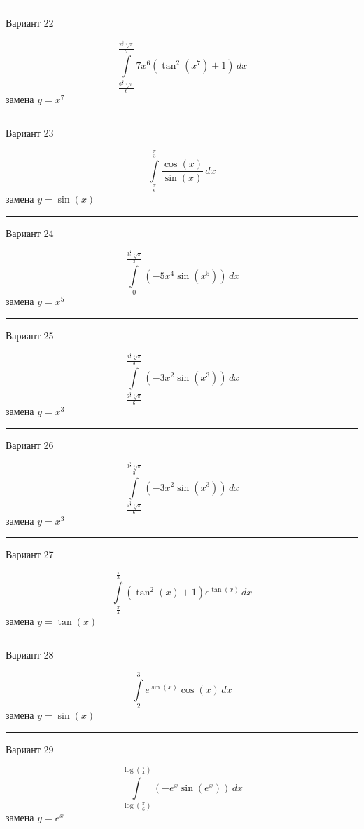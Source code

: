 \documentclass[11pt]{report}
\begin{document}
\rule{\textwidth}{.2mm}

Вариант 22

$$\int\limits_{\frac{6^{\frac{6}{7}} \sqrt[7]{\pi}}{6}}^{\frac{2^{\frac{5}{7}} \sqrt[7]{\pi}}{2}} 7 x^{6} \left(\tan^{2}{\left(x^{7} \right)} + 1\right)\, dx$$
замена $y = x^{7}$



\rule{\textwidth}{.2mm}

Вариант 23

$$\int\limits_{\frac{\pi}{6}}^{\frac{\pi}{3}} \frac{\cos{\left(x \right)}}{\sin{\left(x \right)}}\, dx$$
замена $y = \sin{\left(x \right)}$



\rule{\textwidth}{.2mm}

Вариант 24

$$\int\limits_{0}^{\frac{3^{\frac{4}{5}} \sqrt[5]{\pi}}{3}} \left(- 5 x^{4} \sin{\left(x^{5} \right)}\right)\, dx$$
замена $y = x^{5}$



\rule{\textwidth}{.2mm}

Вариант 25

$$\int\limits_{\frac{6^{\frac{2}{3}} \sqrt[3]{\pi}}{6}}^{\frac{3^{\frac{2}{3}} \sqrt[3]{\pi}}{3}} \left(- 3 x^{2} \sin{\left(x^{3} \right)}\right)\, dx$$
замена $y = x^{3}$



\rule{\textwidth}{.2mm}

Вариант 26

$$\int\limits_{\frac{6^{\frac{2}{3}} \sqrt[3]{\pi}}{6}}^{\frac{3^{\frac{2}{3}} \sqrt[3]{\pi}}{3}} \left(- 3 x^{2} \sin{\left(x^{3} \right)}\right)\, dx$$
замена $y = x^{3}$



\rule{\textwidth}{.2mm}

Вариант 27

$$\int\limits_{\frac{\pi}{4}}^{\frac{\pi}{3}} \left(\tan^{2}{\left(x \right)} + 1\right) e^{\tan{\left(x \right)}}\, dx$$
замена $y = \tan{\left(x \right)}$



\rule{\textwidth}{.2mm}

Вариант 28

$$\int\limits_{2}^{3} e^{\sin{\left(x \right)}} \cos{\left(x \right)}\, dx$$
замена $y = \sin{\left(x \right)}$



\rule{\textwidth}{.2mm}

Вариант 29

$$\int\limits_{\log{\left(\frac{\pi}{6} \right)}}^{\log{\left(\frac{\pi}{4} \right)}} \left(- e^{x} \sin{\left(e^{x} \right)}\right)\, dx$$
замена $y = e^{x}$
\end{document}
